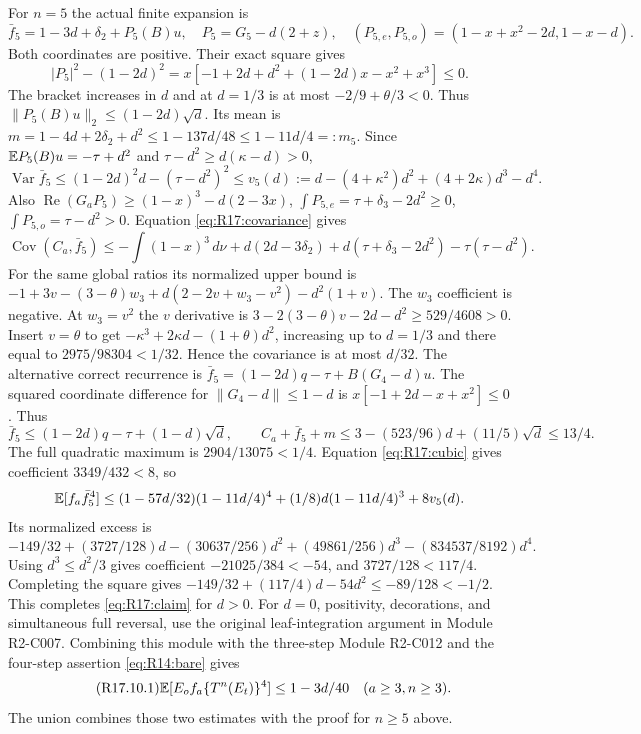 For $n=5$ the actual finite expansion is
\begin{equation}\tag{R17.7.1}\label{eq:R17:five}
\bar f_5=1-3d+\delta_2+P_5(B)u,\quad
P_5=G_5-d(2+z),\quad
(P_{5,e},P_{5,o})=(1-x+x^2-2d,1-x-d).
\end{equation}
Both coordinates are positive. Their exact square gives
\[
|P_5|^2-(1-2d)^2
=x[-1+2d+d^2+(1-2d)x-x^2+x^3]\le0.
\]
The bracket increases in $d$ and at $d=1/3$ is at most
$-2/9+\theta/3<0$. Thus $\|P_5(B)u\|_2\le(1-2d)\sqrt d$.
Its mean is
$m=1-4d+2\delta_2+d^2\le1-137d/48\le1-11d/4=:m_5$.
Since $\mathbb E P_5(B)u=-\tau+d^2$ and
$\tau-d^2\ge d(\kappa-d)>0$,
\[
\operatorname{Var}\bar f_5\le(1-2d)^2d-(\tau-d^2)^2
\le v_5(d):=d-(4+\kappa^2)d^2+(4+2\kappa)d^3-d^4.
\]
Also
$\operatorname{Re}(G_aP_5)\ge(1-x)^3-d(2-3x)$,
$\int P_{5,e}=\tau+\delta_3-2d^2\ge0$,
$\int P_{5,o}=\tau-d^2>0$.
Equation \eqref{eq:R17:covariance} gives
\[
\operatorname{Cov}(C_a,\bar f_5)
\le-\int(1-x)^3\,d\nu+d(2d-3\delta_2)
+d(\tau+\delta_3-2d^2)-\tau(\tau-d^2).
\]
For the same global ratios its normalized upper bound is
$-1+3v-(3-\theta)w_3+d(2-2v+w_3-v^2)-d^2(1+v)$.
The $w_3$ coefficient is negative. At $w_3=v^2$ the $v$ derivative
is $3-2(3-\theta)v-2d-d^2\ge529/4608>0$.
Insert $v=\theta$ to get $-\kappa^3+2\kappa d-(1+\theta)d^2$,
increasing up to $d=1/3$ and there equal to
$2975/98304<1/32$. Hence the covariance is at most $d/32$.
The alternative correct recurrence is
$\bar f_5=(1-2d)q-\tau+B(G_4-d)u$.
The squared coordinate difference for $\|G_4-d\|\le1-d$ is
$x[-1+2d-x+x^2]\le0$. Thus
\[
\bar f_5\le(1-2d)q-\tau+(1-d)\sqrt d,\qquad
C_a+\bar f_5+m\le3-(523/96)d+(11/5)\sqrt d\le13/4.
\]
The full quadratic maximum is $2904/13075<1/4$.
Equation \eqref{eq:R17:cubic} gives coefficient $3349/432<8$, so
\[
\mathbb E[f_a\bar f_5^4]\le(1-57d/32)(1-11d/4)^4
+(1/8)d(1-11d/4)^3+8v_5(d).
\]
Its normalized excess is
\[
-149/32+(3727/128)d-(30637/256)d^2
+(49861/256)d^3-(834537/8192)d^4.
\]
Using $d^3\le d^2/3$ gives coefficient
$-21025/384<-54$, and $3727/128<117/4$. Completing the square gives
$-149/32+(117/4)d-54d^2\le-89/128<-1/2$.
This completes \eqref{eq:R17:claim} for $d>0$.
For $d=0$, positivity, decorations, and simultaneous full reversal,
use the original leaf-integration argument in Module R2-C007.
Combining this module with the three-step Module R2-C012
and the four-step assertion \eqref{eq:R14:bare} gives
\begin{equation}\tag{R17.10.1}\label{eq:R17:union}
\mathbb E[E_of_a\{T^n(E_t)\}^4]\le1-3d/40\quad(a\ge3,n\ge3).
\end{equation}
The union combines those two estimates with the proof for
$n\ge5$ above.

